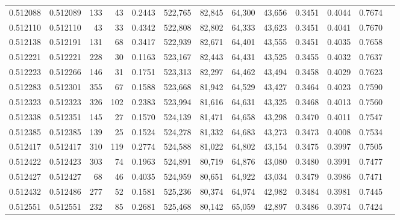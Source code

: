 \begin{tabular}{rrrrrrrrrrrrr}
0.512088 & 0.512089 &   133 &    43 &                                     0.2443 & 522,765 &  82,845 &  64,300 &  43,656 & 0.3451 & 0.4044 & 0.7674 \\
0.512110 & 0.512110 &    43 &    33 &                                     0.4342 & 522,808 &  82,802 &  64,333 &  43,623 & 0.3451 & 0.4041 & 0.7670 \\
0.512138 & 0.512191 &   131 &    68 &                                     0.3417 & 522,939 &  82,671 &  64,401 &  43,555 & 0.3451 & 0.4035 & 0.7658 \\
0.512221 & 0.512221 &   228 &    30 &                                     0.1163 & 523,167 &  82,443 &  64,431 &  43,525 & 0.3455 & 0.4032 & 0.7637 \\
0.512223 & 0.512266 &   146 &    31 &                                     0.1751 & 523,313 &  82,297 &  64,462 &  43,494 & 0.3458 & 0.4029 & 0.7623 \\
0.512283 & 0.512301 &   355 &    67 &                                     0.1588 & 523,668 &  81,942 &  64,529 &  43,427 & 0.3464 & 0.4023 & 0.7590 \\
0.512323 & 0.512323 &   326 &   102 &                                     0.2383 & 523,994 &  81,616 &  64,631 &  43,325 & 0.3468 & 0.4013 & 0.7560 \\
0.512338 & 0.512351 &   145 &    27 &                                     0.1570 & 524,139 &  81,471 &  64,658 &  43,298 & 0.3470 & 0.4011 & 0.7547 \\
0.512385 & 0.512385 &   139 &    25 &                                     0.1524 & 524,278 &  81,332 &  64,683 &  43,273 & 0.3473 & 0.4008 & 0.7534 \\
0.512417 & 0.512417 &   310 &   119 &                                     0.2774 & 524,588 &  81,022 &  64,802 &  43,154 & 0.3475 & 0.3997 & 0.7505 \\
0.512422 & 0.512423 &   303 &    74 &                                     0.1963 & 524,891 &  80,719 &  64,876 &  43,080 & 0.3480 & 0.3991 & 0.7477 \\
0.512427 & 0.512427 &    68 &    46 &                                     0.4035 & 524,959 &  80,651 &  64,922 &  43,034 & 0.3479 & 0.3986 & 0.7471 \\
0.512432 & 0.512486 &   277 &    52 &                                     0.1581 & 525,236 &  80,374 &  64,974 &  42,982 & 0.3484 & 0.3981 & 0.7445 \\
0.512551 & 0.512551 &   232 &    85 &                                     0.2681 & 525,468 &  80,142 &  65,059 &  42,897 & 0.3486 & 0.3974 & 0.7424 \\

\end{tabular}
